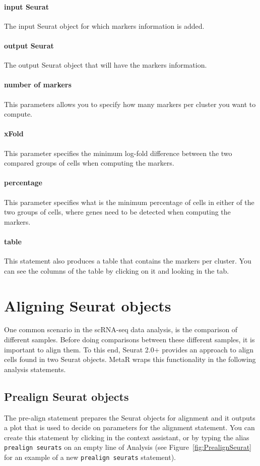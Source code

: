 \paragraph{input Seurat} The input Seurat object for which markers information is added.

\paragraph{output Seurat} The output Seurat object that will have the markers information.

\paragraph{number of markers} This parameters allows you to specify how many markers per cluster
you want to compute.

\paragraph{xFold} This parameter specifies the minimum log-fold difference between
the two compared groups of cells when computing the markers.

\paragraph{percentage} This parameter specifies what is the minimum percentage of cells
in either of the two groups of cells, where genes need to be detected when computing
the markers.

\paragraph{table} This statement also produces a table that contains the markers per cluster.
You can see the columns of the table by clicking on it and looking in the \inspectorTabIcon tab.

\section{Aligning Seurat objects}
One common scenario in the scRNA-seq data analysis, is the comparison of different
samples. Before doing comparisons between these different samples, it is important to align them.
To this end, Seurat 2.0+ provides an approach to align cells found in two Seurat objects. MetaR wraps this functionality in the following analysis statements. 
\subsection{Prealign Seurat objects}
The pre-align statement prepares the Seurat objects for alignment and it outputs a plot that
is used to decide on parameters for the alignment statement. You can create this statement by clicking
 in the context assistant, or by typing
the alias \texttt{prealign seurats} on an empty line of Analysis (see Figure~\ref{fig:PrealignSeurat}
for an example of a new \texttt{prealign seurats} statement).

